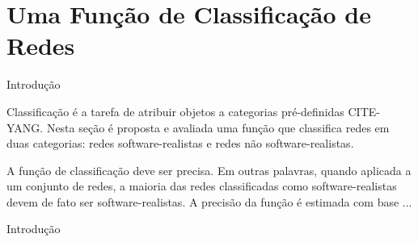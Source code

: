 \chapter{Uma Função de Classificação de Redes} \label{cap:avaliacao}

\begin{section}{Introdução}

Classificação é a tarefa de atribuir objetos a categorias pré-definidas CITE-YANG. Nesta seção é proposta e avaliada uma função que classifica redes em duas categorias: redes software-realistas e redes não software-realistas. %

A função de classificação deve ser precisa. Em outras palavras, quando aplicada a um conjunto de redes, a maioria das redes classificadas como software-realistas devem de fato ser software-realistas. A precisão da função é estimada com base ...


\end{section}{Introdução}

